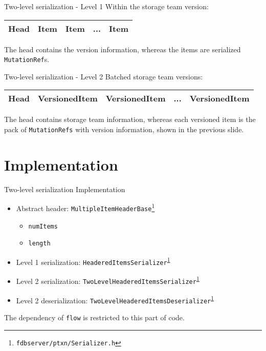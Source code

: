 \documentclass[9pt]{beamer}
\begin{document}
    \begin{frame}{Two-level serialization - Level 1}
        Within the storage team version:
        \begin{center}
            \begin{tabular}{|c|c|c|c|c|}
                \hline
                Head & Item & Item & ... & Item \\
                \hline
            \end{tabular}
        \end{center}
        The head contains the version information, whereas the items are serialized \texttt{MutationRef}s.
    \end{frame}

    \begin{frame}{Two-level serialization - Level 2}
        Batched storage team versions:
        \begin{center}
            \begin{tabular}{|c|c|c|c|c|}
             \hline
             Head & VersionedItem & VersionedItem & ... & VersionedItem\\
             \hline
            \end{tabular}
        \end{center}
        The head contains storage team information, whereas each versioned item is the pack of \texttt{MutationRefs} with version information, shown in the previous slide.
    \end{frame}

    \section{Implementation}

    \begin{frame}{Two-level serialization Implementation}
        \begin{itemize}
            \item Abstract header: \texttt{MultipleItemHeaderBase}\footnote{\label{serializer}\texttt{fdbserver/ptxn/Serializer.h}}
            \begin{itemize}
                \item \texttt{numItems}
                \item \texttt{length}
            \end{itemize}
            \item Level 1 serialization: \texttt{HeaderedItemsSerializer}\textsuperscript{\ref{serializer}}
            \item Level 2 serialization: \texttt{TwoLevelHeaderedItemsSerializer}\textsuperscript{\ref{serializer}}
            \item Level 2 deserialization: \texttt{TwoLevelHeaderedItemsDeserializer}\textsuperscript{\ref{serializer}}
        \end{itemize}
        The dependency of \texttt{flow} is restricted to this part of code.
    \end{frame}
\end{document}
